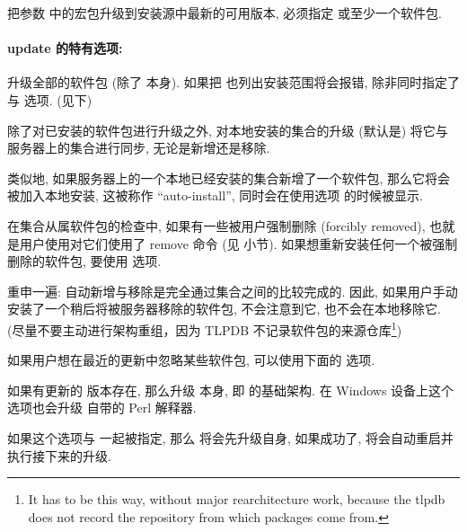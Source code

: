 把参数  中的宏包升级到安装源中最新的可用版本, 必须指定  或至少一个软件包. 

\paragraph{{\mdseries\ac{update}} 的特有选项:}
\begin{description}
    \item {}\par
    升级全部的软件包 (除了 \tlmgr{} 本身). 如果把 \tlmgr 也列出安装范围将会报错, 除非同时指定了  与  选项. (见下)
    
    除了对已安装的软件包进行升级之外, 对本地安装的集合的升级 (默认是) 将它与服务器上的集合进行同步, 无论是新增还是移除. 

    类似地, 如果服务器上的一个本地已经安装的集合新增了一个软件包, 那么它将会被加入本地安装, 这被称作 ``auto-install'', 同时会在使用选项  的时候被显示. 

    在集合从属软件包的检查中, 如果有一些被用户强制删除 (forcibly removed), 也就是用户使用对它们使用了 \tlmgr{} \ac{remove}  命令 (见  小节). 如果想重新安装任何一个被强制删除的软件包, 要使用 \hyperlink{op:-reinstall-forcibly-removed}{} 选项. 

    重申一遍: 自动新增与移除是完全通过集合之间的比较完成的. 因此, 如果用户手动安装了一个稍后将被服务器移除的软件包, \tlmgr{} 不会注意到它, 也不会在本地移除它. (尽量不要主动进行架构重组，因为 TLPDB 不记录软件包的来源仓库\footnote{It has to be this way, without major rearchitecture work, because the tlpdb does not record the repository from which packages come from.})

    如果用户想在最近的更新中忽略某些软件包, 可以使用下面的 \hyperlink{op:exclude}{} 选项. 
    \item {}\par
    如果有更新的 \tlmgr 版本存在, 那么升级 \tlmgr{} 本身, 即 \tlmgr 的基础架构. 在 Windows 设备上这个选项也会升级 \tl 自带的 Perl 解释器. 

    如果这个选项与  一起被指定, 那么 \tlmgr 将会先升级自身, 如果成功了, \tlmgr 将会自动重启并执行接下来的升级. 


\end{description}
